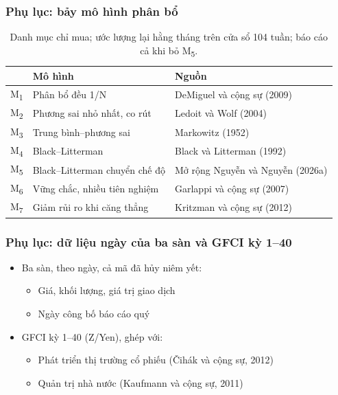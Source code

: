 \documentclass[11pt, xcolor={dvipsnames}, aspectratio=169, usepdftitle=false]{beamer}
\newcommand{\MM}[1]{M\textsubscript{#1}}
\begin{document}
\begin{frame}[label=bayMoHinh]
\frametitle{Phụ lục: bảy mô hình phân bổ}
\begin{table}
\begin{tabular*}{\textwidth}{@{\extracolsep\fill}lll}
\toprule
 & Mô hình & Nguồn\\
\midrule
\MM{1} & Phân bổ đều 1/N & DeMiguel và cộng sự (2009)\\
\MM{2} & Phương sai nhỏ nhất, co rút & Ledoit và Wolf (2004)\\
\MM{3} & Trung bình--phương sai & Markowitz (1952)\\
\midrule
\MM{4} & Black--Litterman & Black và Litterman (1992)\\
\MM{5} & Black--Litterman chuyển chế độ & Mở rộng Nguyễn và Nguyễn (2026a)\\
\midrule
\MM{6} & Vững chắc, nhiều tiên nghiệm & Garlappi và cộng sự (2007)\\
\MM{7} & Giảm rủi ro khi căng thẳng & Kritzman và cộng sự (2012)\\
\bottomrule
\end{tabular*}
\caption{Danh mục chỉ mua; ước lượng lại hằng tháng trên cửa sổ 104 tuần; báo cáo cả khi bỏ \MM{5}.}
\end{table}
\end{frame}

\begin{frame}[label=duLieu]
\frametitle{Phụ lục: dữ liệu ngày của ba sàn và GFCI kỳ 1--40}
\begin{itemize}
\item Ba sàn, theo ngày, cả mã đã hủy niêm yết:
\begin{itemize}
\item Giá, khối lượng, giá trị giao dịch
\item Ngày công bố báo cáo quý
\end{itemize}
\item GFCI kỳ 1--40 (Z/Yen), ghép với:
\begin{itemize}
\item Phát triển thị trường cổ phiếu (Čihák và cộng sự, 2012)
\item Quản trị nhà nước (Kaufmann và cộng sự, 2011)
\end{itemize}
\end{itemize}
\end{frame}
\end{document}
